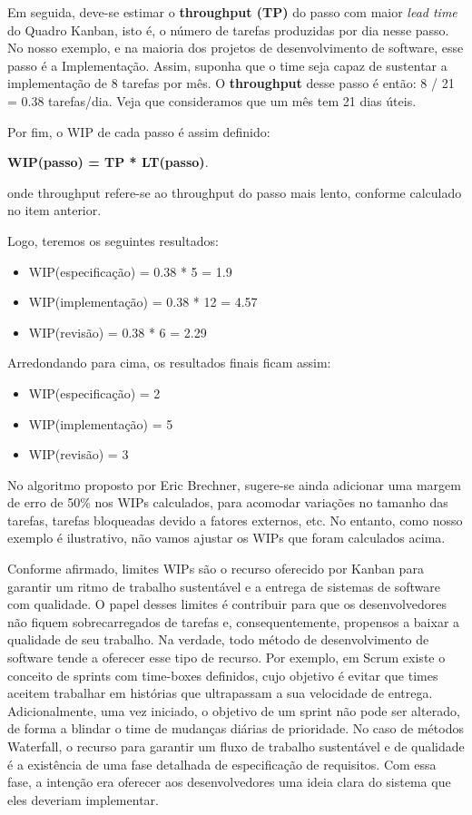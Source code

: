 \documentclass[
  11pt,
  twoside]{book}
\begin{document}
Em seguida, deve-se estimar o \textbf{throughput (TP)} do passo com
maior \emph{lead time} do Quadro Kanban, isto é, o número de tarefas
produzidas por dia nesse passo. No nosso exemplo, e na maioria dos
projetos de desenvolvimento de software, esse passo é a Implementação.
Assim, suponha que o time seja capaz de sustentar a implementação de 8
tarefas por mês. O \textbf{throughput} desse passo é então: 8 / 21 =
0.38 tarefas/dia. Veja que consideramos que um mês tem 21 dias úteis.

Por fim, o WIP de cada passo é assim definido:

\textbf{WIP(passo) = TP * LT(passo)}.

onde throughput refere-se ao throughput do passo mais lento, conforme
calculado no item anterior.

Logo, teremos os seguintes resultados:

\begin{itemize}
\item
  WIP(especificação) = 0.38 * 5 = 1.9
\item
  WIP(implementação) = 0.38 * 12 = 4.57
\item
  WIP(revisão) = 0.38 * 6 = 2.29
\end{itemize}

Arredondando para cima, os resultados finais ficam assim:

\begin{itemize}
\item
  WIP(especificação) = 2
\item
  WIP(implementação) = 5
\item
  WIP(revisão) = 3
\end{itemize}

No algoritmo proposto por Eric Brechner, sugere-se ainda adicionar uma
margem de erro de 50\% nos WIPs calculados, para acomodar variações no
tamanho das tarefas, tarefas bloqueadas devido a fatores externos, etc.
No entanto, como nosso exemplo é ilustrativo, não vamos ajustar os WIPs
que foram calculados acima.

Conforme afirmado, limites WIPs são o recurso oferecido por Kanban para
garantir um ritmo de trabalho sustentável e a entrega de sistemas de
software com qualidade. O papel desses limites é contribuir para que os
desenvolvedores não fiquem sobrecarregados de tarefas e,
consequentemente, propensos a baixar a qualidade de seu trabalho. Na
verdade, todo método de desenvolvimento de software tende a oferecer
esse tipo de recurso. Por exemplo, em Scrum existe o conceito de sprints
com time-boxes definidos, cujo objetivo é evitar que times aceitem
trabalhar em histórias que ultrapassam a sua velocidade de entrega.
Adicionalmente, uma vez iniciado, o objetivo de um sprint não pode ser
alterado, de forma a blindar o time de mudanças diárias de prioridade.
No caso de métodos Waterfall, o recurso para garantir um fluxo de
trabalho sustentável e de qualidade é a existência de uma fase detalhada
de especificação de requisitos. Com essa fase, a intenção era oferecer
aos desenvolvedores uma ideia clara do sistema que eles deveriam
implementar.
\end{document}
